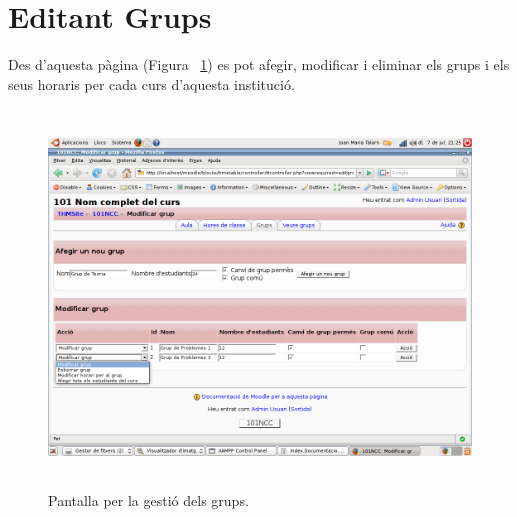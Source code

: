 \documentclass[a4paper]{report}  %
\begin{document}
\section{Editant Grups}
Des d'aquesta pàgina (Figura ~\ref{fig:EditantGrups}) es pot afegir, modificar i eliminar els grups i els seus horaris per cada curs d'aquesta institució.
		\begin{figure}[H] %
		\begin{center}
		\includegraphics[height=10cm,width=12cm]{img/EditantGrups.png}
		\caption[List caption]{Pantalla per la gestió dels grups.}
		\label{fig:EditantGrups}
		\end{center}
		\end{figure}
\end{document}
